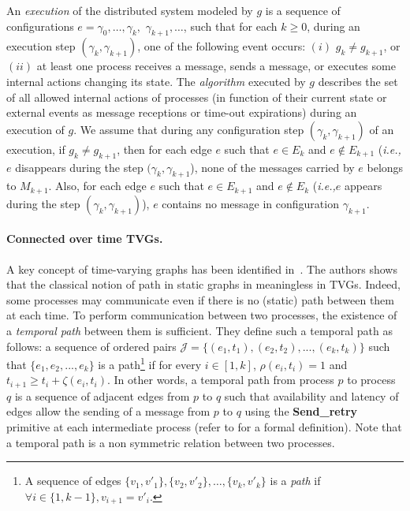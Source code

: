 \documentclass[11pt]{article}
\newcommand{\ie}{{\em i.e.,}\xspace}
\begin{document}
An {\em execution} of the distributed system modeled by $g$ is a sequence of configurations $e=\gamma_{0}, \ldots ,\gamma_{k},$ $\gamma_{k+1}, \ldots$, such that for each $k\geq 0$, during an execution step $(\gamma_k,\gamma_{k+1})$, one of the following event occurs: $(i)$ $g_{k} \neq g_{k+1}$, or $(ii)$ at least one process receives a message, sends a message, or executes some internal actions changing its state. The \emph{algorithm} executed by $g$ describes the set of all allowed internal actions of processes (in function of their current state or external events as message receptions or time-out expirations) during an execution of $g$. We assume that during any configuration step $(\gamma_{k},\gamma_{k+1})$ of an execution, if  $g_{k} \neq g_{k+1}$, then for each edge $e$ such that $e \in E_k$  and $e \notin E_{k+1}$ (\ie $e$ disappears during the step $(\gamma_k,\gamma_{k+1}$), none of the messages carried by $e$ belongs to $M_{k+1}$. Also, for each edge $e$ such that $e \in E_{k+1}$  and $e \notin E_{k}$ (\ie $e$ appears during the step $(\gamma_k,\gamma_{k+1})$), $e$ contains no message in configuration $\gamma_{k+1}$. 

\paragraph{Connected over time TVGs.} A key concept of time-varying graphs has been identified in~\cite{CFQS12}. The authors shows that the classical notion of path in static graphs in meaningless in TVGs. Indeed, some processes may communicate even if there is no (static) path between them at each time. To perform communication between two processes, the existence of a \emph{temporal path} between them is sufficient. They define such a temporal path as follows: a sequence of ordered pairs $\mathcal{J}=\{(e_1,t_1),(e_2,t_2),...,(e_k,t_k)\}$ such that $\{e_1,e_2,...,e_k\}$ is a path\footnote{A sequence of edges $\{v_1,v'_1\}, \{v_2,v'_2\}, \ldots, \{v_k,v'_k\}$ is a \emph{path} if  $\forall i \in\{1,k-1\}, v_{i+1} = v'_{i}$.} if for every $i \in [1,k]$, $\rho(e_i,t_i)=1$ and $t_{i+1} \geq t_i + \zeta(e_i,t_i)$. In other words, a temporal path from process $p$ to process $q$ is a sequence of adjacent edges from $p$ to $q$ such that availability and latency of edges allow the sending of a message from $p$ to $q$ using the \textbf{Send\_retry} primitive at each intermediate process (refer to \cite{CFQS12} for a formal definition). Note that a temporal path is a non symmetric relation between two processes.
\end{document}
